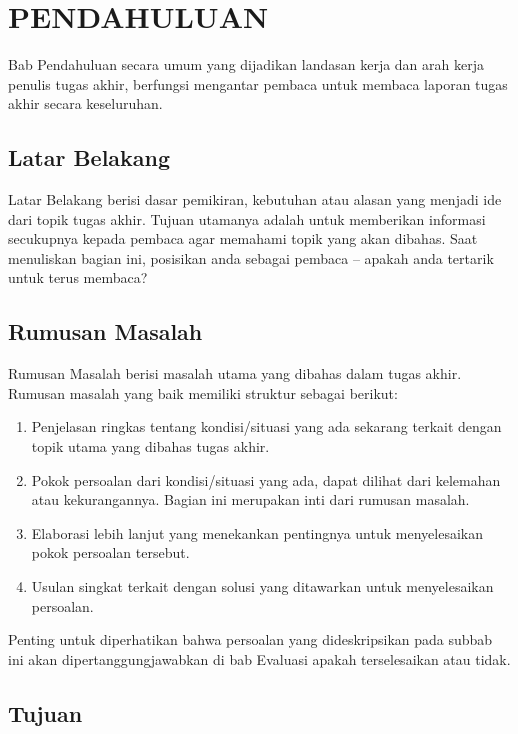 \chapter{PENDAHULUAN}
\setcounter{page}{1}

Bab Pendahuluan secara umum yang dijadikan landasan kerja dan arah kerja penulis tugas akhir, berfungsi mengantar pembaca untuk membaca laporan tugas akhir secara keseluruhan.

\section{Latar Belakang}

Latar Belakang berisi dasar pemikiran, kebutuhan atau alasan yang menjadi ide dari topik tugas akhir. Tujuan utamanya adalah untuk memberikan informasi secukupnya kepada pembaca agar memahami topik yang akan dibahas.  Saat menuliskan bagian ini, posisikan anda sebagai pembaca – apakah anda tertarik untuk terus membaca?

\section{Rumusan Masalah}

Rumusan Masalah berisi masalah utama yang dibahas dalam tugas akhir. Rumusan masalah yang baik memiliki struktur sebagai berikut:

\begin{enumerate}
    \item Penjelasan ringkas tentang kondisi/situasi yang ada sekarang terkait dengan topik utama yang dibahas tugas akhir.
    \item Pokok persoalan dari kondisi/situasi yang ada, dapat dilihat dari kelemahan atau kekurangannya. Bagian ini merupakan inti dari rumusan masalah.
    \item Elaborasi lebih lanjut yang menekankan pentingnya untuk menyelesaikan pokok persoalan tersebut.
    \item Usulan singkat terkait dengan solusi yang ditawarkan untuk menyelesaikan persoalan.
\end{enumerate}

Penting untuk diperhatikan bahwa persoalan yang dideskripsikan pada subbab ini akan dipertanggungjawabkan di bab Evaluasi apakah terselesaikan atau tidak.

\section{Tujuan}

